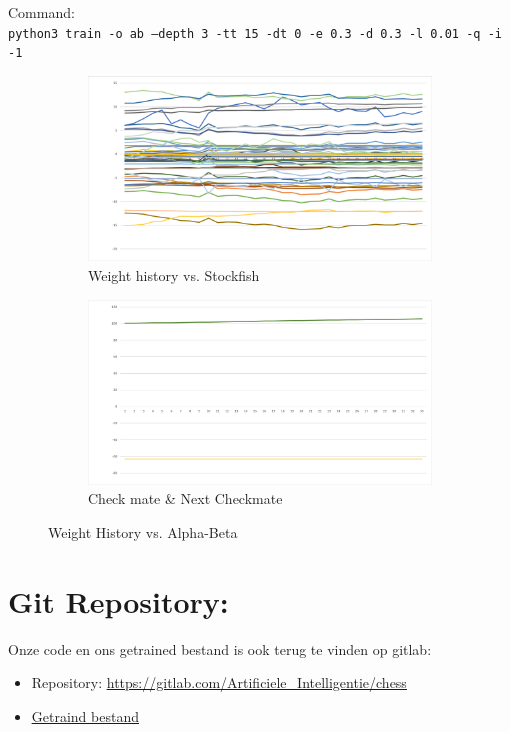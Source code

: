 \documentclass[a4paper,openany]{uantwerpenassignment}
\newcommand{\codeword}[1]{
    \colorbox{code}{\texttt{\textcolor{codetext}{#1}}}
}
\begin{document}
Command:\\
\codeword{python3 train -o ab --depth 3 -tt 15 -dt 0 -e 0.3 -d 0.3 -l 0.01 -q -i -1}

\begin{figure}[h]
    \centering
    \begin{subfigure}{.45\textwidth}
        \centering
        \includegraphics[width=\textwidth]{images/EXCEL_2020-12-12_18-02-40.png}
        \caption{Weight history vs. Stockfish}
        \label{fig:ab}
    \end{subfigure}
    \begin{subfigure}{.45\textwidth}
        \centering
        \includegraphics[width=\textwidth]{images/EXCEL_2020-12-12_17-58-38.png}
        \caption{Check mate \& Next Checkmate}
        \label{fig:abc}
    \end{subfigure}
    \caption{Weight History vs. Alpha-Beta}
\end{figure}

\section{Git Repository:}
Onze code en ons getrained bestand is ook terug te vinden op gitlab: 
\begin{itemize}
    \item Repository: \href{https://gitlab.com/Artificiele_Intelligentie/chess}{\color{blue}\underline{https://gitlab.com/Artificiele\_Intelligentie/chess}}
    \item \href{https://gitlab.com/Artificiele_Intelligentie/chess/-/raw/master/grandQ.json}{\color{blue}\underline{Getraind bestand}}
\end{itemize}



\end{document}
